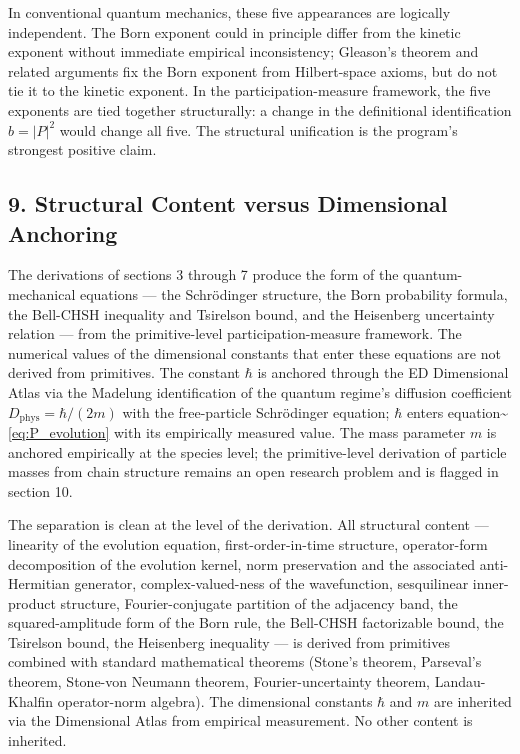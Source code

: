\documentclass[
  11pt,
]{article}
\begin{document}
In conventional quantum mechanics, these five appearances are logically
independent. The Born exponent could in principle differ from the
kinetic exponent without immediate empirical inconsistency; Gleason's
theorem and related arguments fix the Born exponent from Hilbert-space
axioms, but do not tie it to the kinetic exponent. In the
participation-measure framework, the five exponents are tied together
structurally: a change in the definitional identification \(b = |P|^2\)
would change all five. The structural unification is the program's
strongest positive claim.

\subsection{9. Structural Content versus Dimensional
Anchoring}\label{structural-content-versus-dimensional-anchoring}

The derivations of sections 3 through 7 produce the form of the
quantum-mechanical equations --- the Schrödinger structure, the Born
probability formula, the Bell-CHSH inequality and Tsirelson bound, and
the Heisenberg uncertainty relation --- from the primitive-level
participation-measure framework. The numerical values of the dimensional
constants that enter these equations are not derived from primitives.
The constant \(\hbar\) is anchored through the ED Dimensional Atlas via
the Madelung identification of the quantum regime's diffusion
coefficient \(D_{\mathrm{phys}} = \hbar/(2m)\) with the free-particle
Schrödinger equation; \(\hbar\) enters
equation\textasciitilde{}\eqref{eq:P_evolution} with its empirically
measured value. The mass parameter \(m\) is anchored empirically at the
species level; the primitive-level derivation of particle masses from
chain structure remains an open research problem and is flagged in
section 10.

The separation is clean at the level of the derivation. All structural
content --- linearity of the evolution equation, first-order-in-time
structure, operator-form decomposition of the evolution kernel, norm
preservation and the associated anti-Hermitian generator,
complex-valued-ness of the wavefunction, sesquilinear inner-product
structure, Fourier-conjugate partition of the adjacency band, the
squared-amplitude form of the Born rule, the Bell-CHSH factorizable
bound, the Tsirelson bound, the Heisenberg inequality --- is derived
from primitives combined with standard mathematical theorems (Stone's
theorem, Parseval's theorem, Stone-von Neumann theorem,
Fourier-uncertainty theorem, Landau-Khalfin operator-norm algebra). The
dimensional constants \(\hbar\) and \(m\) are inherited via the
Dimensional Atlas from empirical measurement. No other content is
inherited.
\end{document}
